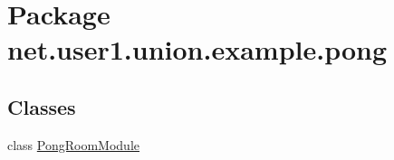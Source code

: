 \hypertarget{namespacenet_1_1user1_1_1union_1_1example_1_1pong}{\section{\-Package net.\-user1.\-union.\-example.\-pong}
\label{namespacenet_1_1user1_1_1union_1_1example_1_1pong}
}
\subsection*{\-Classes}
\begin{DoxyCompactItemize}
\item 
class \hyperlink{classnet_1_1user1_1_1union_1_1example_1_1pong_1_1PongRoomModule}{\-Pong\-Room\-Module}
\end{DoxyCompactItemize}
